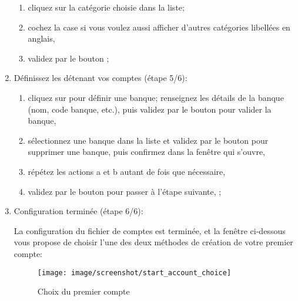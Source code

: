 \begin{enumerate}
		\begin{enumerate} 
		 	\item cliquez sur la catégorie choisie dans la liste;
			\item cochez la case  si vous voulez aussi afficher d'autres catégories libellées en anglais,
			\item validez par le bouton ;
		\end{enumerate}		

	\item Définissez les  détenant vos comptes (étape 5/6):
		\begin{enumerate} 
		 	\item cliquez sur  pour définir une banque; renseignez les détails de la banque (nom, code banque, etc.), puis validez par le bouton  pour valider la banque,
			\item sélectionnez une banque dans la liste et validez par le bouton  pour supprimer une banque, puis confirmez dans la fenêtre qui s'ouvre,
			\item répétez les actions a et b autant de fois que nécessaire,
			\item validez par le bouton  pour passer à l'étape suivante, ;
		\end{enumerate}		 	

	\item Configuration terminée (étape 6/6):\par
	La configuration du fichier de comptes est terminée, et la fenêtre ci-dessous vous propose de choisir l'une des deux méthodes de création de votre premier compte:

\vspace{2mm}

\begin{figure}[htbp]
	\begin{center}
		\texttt{[image: image/screenshot/start\_account\_choice]}
	\end{center}
	\caption{Choix du premier compte}
	\label{start_account_choice}
\end{figure}


\end{enumerate}
